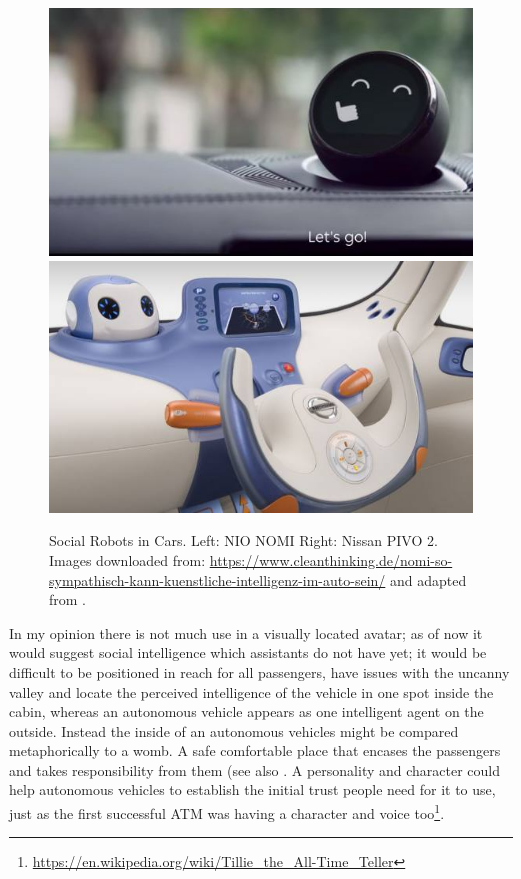 \begin{figure}
    \includegraphics[height=0.28\textwidth]{fig/NOMI}\hfill\includegraphics[height=0.28\textwidth]{fig/PIVO}
    \caption[Social Robots in Cars]{Social Robots in Cars. Left: NIO NOMI 
   Right: Nissan PIVO 2. Images downloaded from: \url{https://www.cleanthinking.de/nomi-so-sympathisch-kann-kuenstliche-intelligenz-im-auto-sein/} and adapted from \cite{Perchonok2009FacilitatingLiterature}.}
    \label{fig:robots}
\end{figure}
In my opinion there is not much use in a visually located  avatar; as of now it would suggest social intelligence which assistants do not have yet; it would be difficult to be positioned in reach for all passengers, have issues with the uncanny valley and locate the perceived intelligence of the vehicle in one spot inside the cabin, whereas an autonomous vehicle appears as one intelligent agent on the outside. Instead the inside of an autonomous vehicles might be compared metaphorically to a womb. A safe comfortable place that encases the passengers and takes responsibility from them (see also . A personality and character could help autonomous vehicles to establish the initial trust people need for it to use, just as the first successful ATM was having a character and voice too\footnote{\url{https://en.wikipedia.org/wiki/Tillie_the_All-Time_Teller}}.

